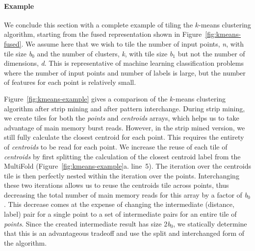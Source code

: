 \paragraph{Example} We conclude this section with a complete example of tiling the $k$-means clustering algorithm, starting from the fused representation shown in Figure~\ref{fig:kmeans-fused}. We assume here that we wish
to tile the number of input points, \emph{n}, with tile size \emph{b$_0$} and the number of clusters, \emph{k}, with tile size \emph{b$_1$} but not the number of dimensions, \emph{d}. This is representative of machine learning
classification problems where the number of input points and number of labels is large, but the number of features for each point is relatively small.

Figure~\ref{fig:kmeans-example} gives a comparison of the $k$-means clustering algorithm after strip mining and after pattern interchange. During strip mining, we create
tiles for both the \emph{points} and \emph{centroids} arrays, which helps us to take advantage of main memory burst reads. However, in the strip mined version, we still fully
calculate the closest centroid for each point. This requires the entirety of \emph{centroids} to be read for each point. We increase the reuse of each tile of \emph{centroids} by first splitting
the calculation of the closest centroid label from the MultiFold (Figure~\ref{fig:kmeans-example}a. line~5). The iteration over the centroids tile is then perfectly nested within the iteration over the points. Interchanging these two iterations allows us to reuse the centroids tile across points, thus decreasing the total number of main memory reads for this array by a factor of \emph{b$_0$}. This decrease comes
at the expense of changing the intermediate (distance, label) pair for a single point to a set of intermediate pairs for an entire tile of \emph{points}. Since the created intermediate result
has size 2\emph{b$_0$}, we statically determine that this is an advantageous tradeoff and use the split and interchanged form of the algorithm.
